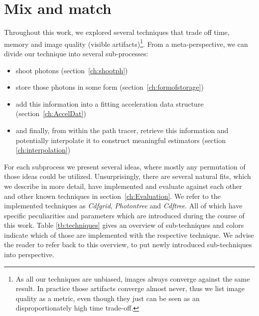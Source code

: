 \section{Mix and match}

Throughout this work, we explored several techniques that trade off time, memory and image quality (visible artifacts)\footnote{As all our techniques are unbiased, images always converge against the same result. In practice those artifacts converge almost never, thus we list image quality as a metric, even though they just can be seen as an disproportionately high time trade-off.}. From a meta-perspective, we can divide our technique into several sub-processes:

\begin{itemize}
    \item shoot photons (section~\ref{ch:shootph})
    \item store those photons in some form (section~\ref{ch:formofstorage})
    \item add this information into a fitting acceleration data structure (section~\ref{ch:AccelDat})
    \item and finally, from within the path tracer, retrieve this information and potentially interpolate it to construct meaningful estimators (section \ref{ch:interpolation})
\end{itemize}

For each subprocess we present several ideas, where mostly any permutation of those ideas could be utilized. Unsurprisingly, there are several natural fits, which we describe in more detail, have implemented and evaluate against each other and other known techniques in section~\ref{ch:Evaluation}. We refer to the implemented techniques as \textit{Cdfgrid}, \textit{Photontree} and \textit{Cdftree}. All of which have specific peculiarities and parameters which are introduced during the course of this work. Table \ref{tb:techniques} gives an overview of sub-techniques and colors indicate which of those are implemented with the respective technique. We advise the reader to refer back to this overview, to put newly introduced sub-techniques into perspective.

